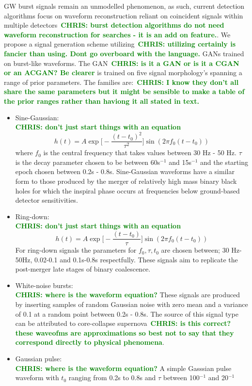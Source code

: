 \documentclass[12pt]{iopart}
\newcommand{\chris}[1]{\textbf{\textcolor{green}{CHRIS: #1}}}
\begin{document}
%
\ac{GW} burst signals remain an unmodelled phenomenon, as such, current
detection algorithms focus on waveform reconstruction reliant on coincident
signals within multiple detectors~\chris{burst detection algorithms do not need
waveform reconstruction for searches - it is an add on feature.}. We propose a
signal generation scheme utilizing~\chris{utilizing certainly is fancier than
using. Dont go overboard with the language.} \acp{GAN} trained on burst-like
waveforms. The \ac{GAN}~\chris{is it a GAN or is it a CGAN or an ACGAN? Be
clearer} is trained on five signal morphology's spanning a range of prior
parameters. The families are:~\chris{I know they don't all share the same
parameters but it might be sensible to make a table of the prior ranges rather
than haviong it all stated in text.}
%
\begin{itemize}
%
\item Sine-Gaussian:\\
\chris{don't just start things with an equation}		
%
\begin{equation}
\label{eqn:sg}
h(t) = A \exp\bigg[ - \frac{(t-t_{0})^2}{\tau^2} \bigg] \sin (2 \pi f_0 (t-t_0))
\end{equation}	
%		
where $f_0$ is the central frequency that takes values between 30 Hz - 50 Hz.
$\tau$ is the decay parameter chosen to be between 60s$^{-1}$  and 15s$^{-1}$
and the starting epoch chosen between 0.2s - 0.8s. Sine-Gaussian waveforms have
a similar form to those produced by the merger of relatively high mass binary
black holes for which the inspiral phase occurs at frequencies below
ground-based detector sensitivities.
%
\item Ring-down:\\
\chris{don't just start things with an equation}
%
\begin{equation}
h(t) = A \exp \bigg[-\frac{(t-t_0)}{\tau}\bigg]\sin(2 \pi f_0 (t-t_0))
\end{equation}
%		
For ring-down signals the parameters for $f_0, \tau, t_0$ are chosen between;
30 Hz-50Hz, 0.02-0.1 and 0.1s-0.8s respectfully. These signals aim to replicate
the post-merger late stages of binary coalescence.
%
\item White-noise bursts:\\
\chris{where is the waveform equation?}
These signals are produced by inserting samples of random Gaussian noise with
zero mean and a variance of 0.1 at a random point between 0.2s - 0.8s. The
source of this signal type can be attributed to core-collapse
supernova~\chris{is this correct? these waveofms are approximations so best not
to say that they correspond directly to physical phenomena}.
%
\item Gaussian pulse:\\
\chris{where is the waveform equation?}
A simple Gasssian pulse waveform with $t_0$ ranging from 0.2s to 0.8s and
$\tau$ between  100$^{-1}$ and 20$^{-1}$
	

\end{itemize}
\end{document}
